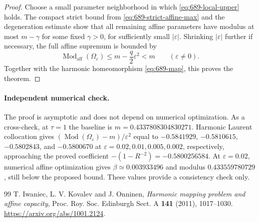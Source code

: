 \documentclass[11pt,a4paper]{article}
\theoremstyle{remark}
\begin{document}
\begin{proof}
Choose a small parameter neighborhood in which \eqref{eq:689-local-upper} holds. The compact strict bound from \eqref{eq:689-strict-affine-max} and the degeneration estimate show that all remaining affine parameters have modulus at most $m-\gamma$ for some fixed $\gamma>0$, for sufficiently small $|\varepsilon|$. Shrinking $|\varepsilon|$ further if necessary, the full affine supremum is bounded by
\[
 \operatorname{Mod}_{\mathrm{aff}}(\Omega_\varepsilon)
 \le m-\frac q2\varepsilon^2<m
 \qquad(\varepsilon\ne0).
\]
Together with the harmonic homeomorphism \eqref{eq:689-map}, this proves the theorem.
\end{proof}

\paragraph{Independent numerical check.}
The proof is asymptotic and does not depend on numerical optimization. As a cross-check, at $\tau=1$ the baseline is $m=0.4337808304830271$. Harmonic Laurent collocation gives
$(\operatorname{Mod}(\Omega_\varepsilon)-m)/\varepsilon^2$ equal to
$-0.5841929$, $-0.5810615$, $-0.5802843$, and $-0.5800670$ at
$\varepsilon=0.02,0.01,0.005,0.002$, respectively, approaching the proved coefficient $-(1-R^{-2})=-0.5800256584$. At $\varepsilon=0.02$, numerical affine optimization gives $\beta\simeq0.003933496$ and modulus $0.433559780729$, still below the proposed bound. These values provide a consistency check only.

\begingroup\small
\begin{thebibliography}{99}
 T. Iwaniec, L. V. Kovalev and J. Onninen, \emph{Harmonic mapping problem and affine capacity}, Proc. Roy. Soc. Edinburgh Sect. A \textbf{141} (2011), 1017--1030. \url{https://arxiv.org/abs/1001.2124}.
\end{thebibliography}
\endgroup
\end{document}
